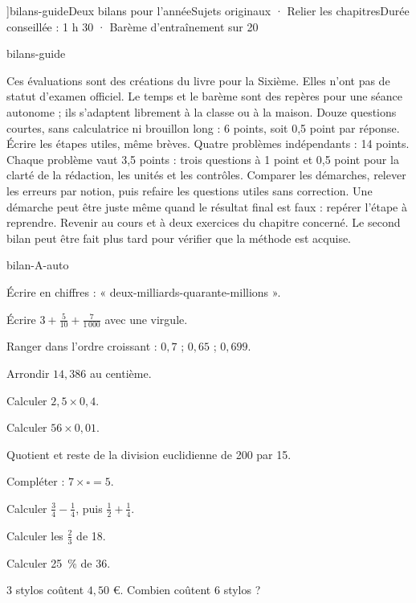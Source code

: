 \editionPage[\pdfbookmark[0]{Deux bilans annuels}{bm-bilans-guide-parent}]{bilans-guide}{Deux bilans pour l’année}{Sujets originaux · Relier les chapitres}{Durée conseillée : 1 h 30 · Barème d’entraînement sur 20}
\begin{blocEdition}{bilans-guide}

Ces évaluations sont des créations du livre pour la Sixième. Elles n’ont
pas de statut d’examen officiel. Le temps et le barème sont des repères pour
une séance autonome ; ils s’adaptent librement à la classe ou à la maison.
Douze questions courtes, sans calculatrice ni brouillon long : 6 points,
soit 0,5 point par réponse. Écrire les étapes utiles, même brèves.
Quatre problèmes indépendants : 14 points. Chaque problème vaut
3,5 points : trois questions à 1 point et 0,5 point pour la clarté de la
rédaction, les unités et les contrôles.
Comparer les démarches, relever les erreurs par notion, puis refaire
les questions utiles sans correction. Une démarche peut être juste
même quand le résultat final est faux : repérer l’étape à reprendre.
Revenir au cours et à deux exercices du chapitre concerné. Le second
bilan peut être fait plus tard pour vérifier que la méthode est acquise.

\end{blocEdition}
\begin{blocEdition}{bilan-A-auto}
\begin{questions}
\item Écrire en chiffres : « deux-milliards-quarante-millions ».
\item Écrire $3+\frac5{10}+\frac7{1\,000}$ avec une virgule.
\item Ranger dans l’ordre croissant : $0{,}7$ ; $0{,}65$ ; $0{,}699$.
\item Arrondir $14{,}386$ au centième.
\item Calculer $2{,}5\times0{,}4$.
\item Calculer $56\times0{,}01$.
\item Quotient et reste de la division euclidienne de 200 par 15.
\item Compléter : $7\times\square=5$.
\item Calculer $\frac34-\frac14$, puis $\frac12+\frac14$.
\item Calculer les $\frac23$ de 18.
\item Calculer 25~\% de 36.
\item 3 stylos coûtent $4{,}50$ €. Combien coûtent 6 stylos ?\end{questions}
\end{blocEdition}
